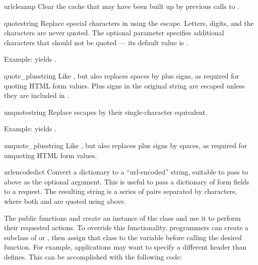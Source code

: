 \begin{funcdesc}{urlcleanup}{}
Clear the cache that may have been built up by previous calls to
.
\end{funcdesc}

\begin{funcdesc}{quote}{string}
Replace special characters in  using the  escape.
Letters, digits, and the characters  are never quoted.
The optional  parameter specifies additional characters
that should not be quoted --- its default value is .

Example:  yields .
\end{funcdesc}

\begin{funcdesc}{quote_plus}{string}
Like , but also replaces spaces by plus signs, as
required for quoting HTML form values.  Plus signs in the original
string are escaped unless they are included in .
\end{funcdesc}

\begin{funcdesc}{unquote}{string}
Replace  escapes by their single-character equivalent.

Example:  yields .
\end{funcdesc}

\begin{funcdesc}{unquote_plus}{string}
Like , but also replaces plus signs by spaces, as
required for unquoting HTML form values.
\end{funcdesc}

\begin{funcdesc}{urlencode}{dict}
Convert a dictionary to a ``url-encoded'' string, suitable to pass to
 above as the optional  argument.  This
is useful to pass a dictionary of form fields to a 
request.  The resulting string is a series of
 pairs separated by \character{\&}
characters, where both  and  are quoted using
 above.
\end{funcdesc}

The public functions  and 
create an instance of the  class and use it to perform
their requested actions.  To override this functionality, programmers can
create a subclass of  or , then
assign that class to the  variable before calling the
desired function.  For example, applications may want to specify a different
 header than  defines.  This can be
accomplished with the following code:

